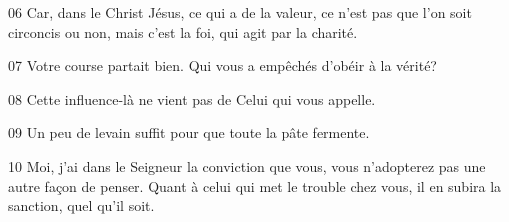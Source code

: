 
06 Car, dans le Christ Jésus, ce qui a de la valeur, ce n’est pas que l’on soit circoncis ou non, mais c’est la foi, qui agit par la charité.

07 Votre course partait bien. Qui vous a empêchés d’obéir à la vérité?

08 Cette influence-là ne vient pas de Celui qui vous appelle.

09 Un peu de levain suffit pour que toute la pâte fermente.

10 Moi, j’ai dans le Seigneur la conviction que vous, vous n’adopterez pas une autre façon de penser. Quant à celui qui met le trouble chez vous, il en subira la sanction, quel qu’il soit.
